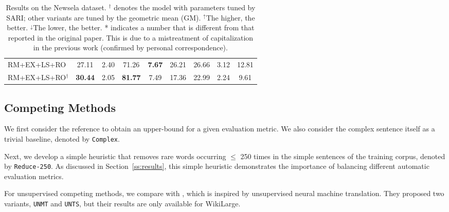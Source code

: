 \documentclass[11pt,a4paper]{article}
\begin{document}
\begin{table*}[t!]
\begin{center}
{\begin{tabular}{|l|c|c|c|c|c|c|c|c|}
RM+EX+LS+RO & 27.11 & 2.40 & 71.26 & \textbf{7.67} & 26.21 & 26.66 & 3.12 & 12.81 \\
RM+EX+LS+RO$^{\dagger}$ & \textbf{30.44} & 2.05 & \textbf{81.77} & 7.49 & 17.36 & 22.99 & 2.24 & 9.61 \\
\hline
\end{tabular}
}
\end{center}\vspace{-.3cm}
\caption{\label{results-Newsela} Results on the Newsela dataset. $^{\dagger}$ denotes the model with parameters tuned by SARI; other variants are tuned by the geometric mean (GM). $^\uparrow$The higher, the better. $^\downarrow$The lower, the better. * indicates a number that is different from that reported in the original paper. This is due to a mistreatment of capitalization in the previous work (confirmed by personal correspondence).}\vspace{-.2cm}
\end{table*}


\subsection{Competing Methods}

We first consider the reference to obtain an upper-bound for a given evaluation metric. 
We also consider the complex sentence itself as a trivial baseline, denoted by \texttt{Complex}.  

Next, we develop a simple heuristic that removes rare words occurring $\le$ 250 times in the simple sentences of the training corpus, denoted by \texttt{Reduce-250}. As discussed in Section~\ref{ss:results}, this simple heuristic demonstrates the importance of balancing different automatic evaluation metrics. 

For unsupervised competing methods, we compare with , which is inspired by unsupervised neural machine translation. They proposed two variants, \texttt{UNMT} and \texttt{UNTS}, but their results are only available for WikiLarge.
\end{document}
